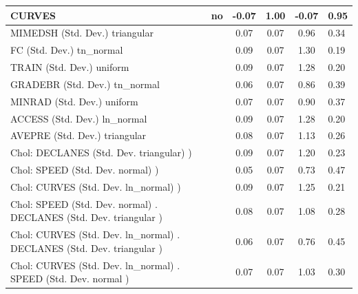 \begin{table}
\begin{center}
\begin{tabular}{|l|l|c|c|c|l|}
			\hline
			CURVES & no & -0.07 & 1.00 & -0.07 & 0.95 \\
			\hline
			MIMEDSH (Std. Dev.) triangular &  & 0.07 & 0.07 & 0.96 & 0.34 \\
			\hline
			FC (Std. Dev.) tn_normal &  & 0.09 & 0.07 & 1.30 & 0.19 \\
			\hline
			TRAIN (Std. Dev.) uniform &  & 0.09 & 0.07 & 1.28 & 0.20 \\
			\hline
			GRADEBR (Std. Dev.) tn_normal &  & 0.06 & 0.07 & 0.86 & 0.39 \\
			\hline
			MINRAD (Std. Dev.) uniform &  & 0.07 & 0.07 & 0.90 & 0.37 \\
			\hline
			ACCESS (Std. Dev.) ln_normal &  & 0.09 & 0.07 & 1.28 & 0.20 \\
			\hline
			AVEPRE (Std. Dev.) triangular &  & 0.08 & 0.07 & 1.13 & 0.26 \\
			\hline
			 Chol: DECLANES (Std. Dev. triangular) ) &  & 0.09 & 0.07 & 1.20 & 0.23 \\
			\hline
			 Chol: SPEED (Std. Dev. normal) ) &  & 0.05 & 0.07 & 0.73 & 0.47 \\
			\hline
			 Chol: CURVES (Std. Dev. ln_normal) ) &  & 0.09 & 0.07 & 1.25 & 0.21 \\
			\hline
			 Chol: SPEED (Std. Dev. normal) . DECLANES (Std. Dev.   triangular ) &  & 0.08 & 0.07 & 1.08 & 0.28 \\
			\hline
			 Chol: CURVES (Std. Dev. ln_normal) . DECLANES (Std. Dev.   triangular ) &  & 0.06 & 0.07 & 0.76 & 0.45 \\
			\hline
			 Chol: CURVES (Std. Dev. ln_normal) . SPEED (Std. Dev.   normal ) &  & 0.07 & 0.07 & 1.03 & 0.30 \\
			\hline
		\end{tabular}
	\end{center}
\end{table}
